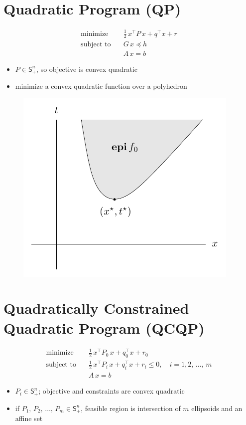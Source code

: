 \documentclass[11pt]{extarticle}
\newcommand{\ds}{\displaystyle}
\theoremstyle{definition}
\begin{document}
\newpage

\section*{Quadratic Program (QP)}
\vspace{-1em}
\begin{align*}
  \text{minimize}\quad & \frac{1}{2}\,x^\top P\,x + q^\top x + r \\
  \text{subject to}\quad & G\,x\preccurlyeq h \\
  \qquad\qquad &A\,x = b
\end{align*}
\vspace{-2em}
\begin{itemize}
  \item $\ds P\in\mathsf{S}^n_+$, so objective is convex quadratic 
  \item minimize a convex quadratic function over a polyhedron 
\end{itemize}
\vspace{-1em}
\begin{figure}[!htbp]
  \centering
  \includegraphics[scale=0.6,page=5]{fig/04.pdf}
\end{figure}

\newpage

\section*{Quadratically Constrained Quadratic Program (QCQP)}
\begin{align*}
  \text{minimize}\quad & \frac{1}{2}\,x^\top P_0\,x + q_0^\top x + r_0 \\
  \text{subject to}\quad & \frac{1}{2}\,x^\top P_i\,x + q_i^\top x + r_i \leqslant 0, \quad i = 1, 2,\,\ldots,\,m \\
  \qquad\qquad &A\,x = b
\end{align*}
\begin{itemize}
  \item $\ds P_i\in\mathsf{S}^n_+$; objective and constraints are convex quadratic 
  \item if $\ds P_1,\,P_2,\,\ldots,\,P_m\in\mathsf{S}^n_+$, feasible region is intersection of $m$ ellipsoids and an affine set  
\end{itemize}
\end{document}
